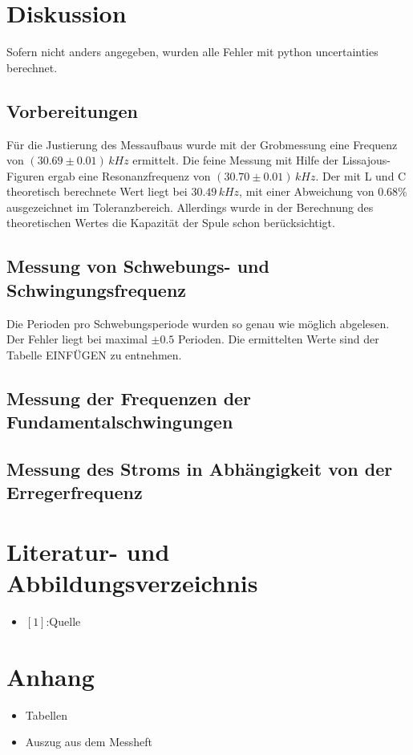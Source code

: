 \documentclass[11pt,ngerman,a4paper]{article}
\begin{document}
\section{Diskussion}
Sofern nicht anders angegeben, wurden alle Fehler mit python uncertainties berechnet.
\subsection{Vorbereitungen}
Für die Justierung des Messaufbaus wurde mit der Grobmessung eine Frequenz von $(30.69\pm0.01)\,kHz$ ermittelt. Die feine Messung mit Hilfe der Lissajous-Figuren ergab eine Resonanzfrequenz von $(30.70\pm0.01) \, kHz$. Der mit L und C theoretisch berechnete Wert liegt bei $30.49 \, kHz$, mit einer Abweichung von $0.68 \%$ ausgezeichnet im Toleranzbereich. Allerdings wurde in der Berechnung des theoretischen Wertes die Kapazität der Spule schon berücksichtigt.
\subsection{Messung von Schwebungs- und Schwingungsfrequenz}
Die Perioden pro Schwebungsperiode wurden so genau wie möglich abgelesen. Der Fehler liegt bei maximal $\pm 0.5$ Perioden. Die ermittelten Werte sind der Tabelle EINFÜGEN zu entnehmen.


\subsection{Messung der Frequenzen der Fundamentalschwingungen}
\subsection{Messung des Stroms in Abhängigkeit von der Erregerfrequenz}

\section{Literatur- und Abbildungsverzeichnis}
\begin{itemize}
\item $[1]$:Quelle
\end{itemize}
\section{Anhang}
\begin{itemize}
\item Tabellen
\item Auszug aus dem Messheft


\end{itemize}

\newpage
\end{document}
